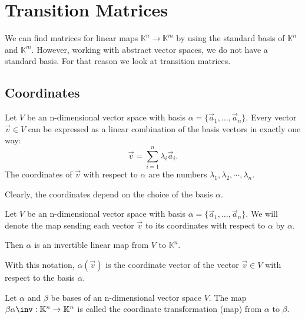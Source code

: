 \section{Transition Matrices}

We can find matrices for linear maps $\mathbb{K}^n \to \mathbb{K}^m$ by using the standard basis of $\mathbb{K}^n$ and $\mathbb{K}^m$.
However, working with abstract vector spaces, we do not have a standard basis. For that reason we look at transition matrices.

\subsection{Coordinates}
\begin{definition}[coordinates]
    Let $V$ be an n-dimensional vector space with basis $\alpha = \{\vec{a}_1, \dots, \vec{a}_n\}$. Every vector $\vec{v} \in V$ can be
    expressed as a linear combination of the basis vectors in exactly one way:
    \begin{equation}
        \vec{v} = \sum_{i=1}^n \lambda_i \vec{a}_i.
    \end{equation}
    The coordinates of $\vec{v}$ with respect to $\alpha$ are the numbers $\lambda_1, \lambda_2, \cdots, \lambda_n$.
\end{definition}

\begin{remark}
    Clearly, the coordinates depend on the choice of the basis $\alpha$.
\end{remark}

\begin{theorem}
    Let $V$ be an n-dimensional vector space with basis $\alpha = \{\vec{a}_1, \dots, \vec{a}_n\}$. We will denote the
    map sending each vector $\vec{v}$ to its coordinates with respect to $\alpha$ by $\alpha$.

    Then $\alpha$ is an invertible linear map from $V$ to $\mathbb{K}^n$.
\end{theorem}

With this notation, $\alpha(\vec{v})$ is the coordinate vector of the vector $\vec{v} \in V$ with respect to the basis $\alpha$. 

\begin{definition}
    Let $\alpha$ and $\beta$ be bases of an n-dimensional vector space $V$. The map $\beta\alpha\inv: \mathbb{K}^n \to \mathbb{K}^n$
    is called the coordinate transformation (map) from $\alpha$ to $\beta$.
\end{definition}

